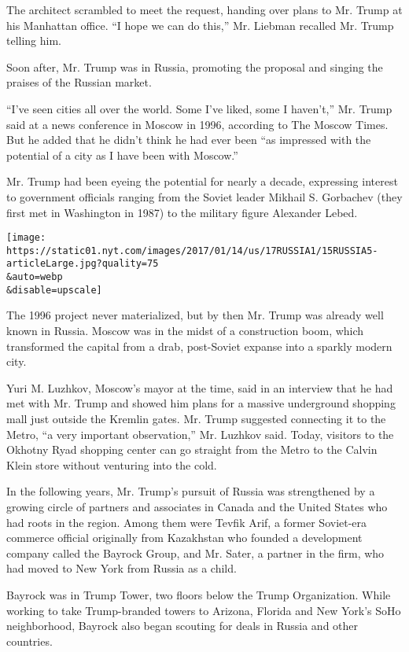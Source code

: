 The architect scrambled to meet the request, handing over plans to Mr.
Trump at his Manhattan office. ``I hope we can do this,'' Mr. Liebman
recalled Mr. Trump telling him.

Soon after, Mr. Trump was in Russia, promoting the proposal and singing
the praises of the Russian market.

``I've seen cities all over the world. Some I've liked, some I
haven't,'' Mr. Trump said at a news conference in Moscow in 1996,
according to The Moscow Times. But he added that he didn't think he had
ever been ``as impressed with the potential of a city as I have been
with Moscow.''

Mr. Trump had been eyeing the potential for nearly a decade, expressing
interest to government officials ranging from the Soviet leader Mikhail
S. Gorbachev (they first met in Washington in 1987) to the military
figure Alexander Lebed.

\texttt{[image: https://static01.nyt.com/images/2017/01/14/us/17RUSSIA1/15RUSSIA5-articleLarge.jpg?quality=75\\\&auto=webp\\\&disable=upscale]}

The 1996 project never materialized, but by then Mr. Trump was already
well known in Russia. Moscow was in the midst of a construction boom,
which transformed the capital from a drab, post-Soviet expanse into a
sparkly modern city.

Yuri M. Luzhkov, Moscow's mayor at the time, said in an interview that
he had met with Mr. Trump and showed him plans for a massive underground
shopping mall just outside the Kremlin gates. Mr. Trump suggested
connecting it to the Metro, ``a very important observation,'' Mr.
Luzhkov said. Today, visitors to the Okhotny Ryad shopping center can go
straight from the Metro to the Calvin Klein store without venturing into
the cold.

In the following years, Mr. Trump's pursuit of Russia was strengthened
by a growing circle of partners and associates in Canada and the United
States who had roots in the region. Among them were Tevfik Arif, a
former Soviet-era commerce official originally from Kazakhstan who
founded a development company called the Bayrock Group, and Mr. Sater, a
partner in the firm, who had moved to New York from Russia as a child.

Bayrock was in Trump Tower, two floors below the Trump Organization.
While working to take Trump-branded towers to Arizona, Florida and New
York's SoHo neighborhood, Bayrock also began scouting for deals in
Russia and other countries.

